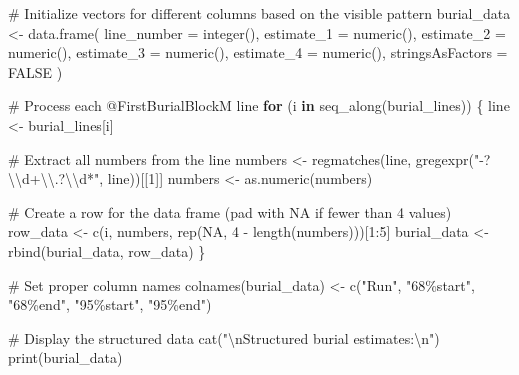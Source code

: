 \documentclass[
]{agujournal2019}
\newenvironment{Shaded}{\begin{snugshade}}{\end{snugshade}}
\newcommand{\AttributeTok}[1]{\textcolor[rgb]{0.40,0.45,0.13}{#1}}
\newcommand{\CommentTok}[1]{\textcolor[rgb]{0.37,0.37,0.37}{#1}}
\newcommand{\ConstantTok}[1]{\textcolor[rgb]{0.56,0.35,0.01}{#1}}
\newcommand{\ControlFlowTok}[1]{\textcolor[rgb]{0.00,0.23,0.31}{\textbf{#1}}}
\newcommand{\DecValTok}[1]{\textcolor[rgb]{0.68,0.00,0.00}{#1}}
\newcommand{\FunctionTok}[1]{\textcolor[rgb]{0.28,0.35,0.67}{#1}}
\newcommand{\NormalTok}[1]{\textcolor[rgb]{0.00,0.23,0.31}{#1}}
\newcommand{\OtherTok}[1]{\textcolor[rgb]{0.00,0.23,0.31}{#1}}
\newcommand{\SpecialCharTok}[1]{\textcolor[rgb]{0.37,0.37,0.37}{#1}}
\newcommand{\StringTok}[1]{\textcolor[rgb]{0.13,0.47,0.30}{#1}}
\begin{document}
\begin{Shaded}
\begin{Highlighting}[]
\CommentTok{\# Initialize vectors for different columns based on the visible pattern}
\NormalTok{burial\_data }\OtherTok{\textless{}{-}} \FunctionTok{data.frame}\NormalTok{(}
  \AttributeTok{line\_number =} \FunctionTok{integer}\NormalTok{(),}
  \AttributeTok{estimate\_1 =} \FunctionTok{numeric}\NormalTok{(),}
  \AttributeTok{estimate\_2 =} \FunctionTok{numeric}\NormalTok{(),}
  \AttributeTok{estimate\_3 =} \FunctionTok{numeric}\NormalTok{(),}
  \AttributeTok{estimate\_4 =} \FunctionTok{numeric}\NormalTok{(),}
  \AttributeTok{stringsAsFactors =} \ConstantTok{FALSE}
\NormalTok{)}

\CommentTok{\# Process each @FirstBurialBlockM line}
\ControlFlowTok{for}\NormalTok{ (i }\ControlFlowTok{in} \FunctionTok{seq\_along}\NormalTok{(burial\_lines)) \{}
\NormalTok{  line }\OtherTok{\textless{}{-}}\NormalTok{ burial\_lines[i]}
  
  \CommentTok{\# Extract all numbers from the line}
\NormalTok{  numbers }\OtherTok{\textless{}{-}} \FunctionTok{regmatches}\NormalTok{(line, }\FunctionTok{gregexpr}\NormalTok{(}\StringTok{"{-}?}\SpecialCharTok{\textbackslash{}\textbackslash{}}\StringTok{d+}\SpecialCharTok{\textbackslash{}\textbackslash{}}\StringTok{.?}\SpecialCharTok{\textbackslash{}\textbackslash{}}\StringTok{d*"}\NormalTok{, line))[[}\DecValTok{1}\NormalTok{]]}
\NormalTok{  numbers }\OtherTok{\textless{}{-}} \FunctionTok{as.numeric}\NormalTok{(numbers)}
  
  \CommentTok{\# Create a row for the data frame (pad with NA if fewer than 4 values)}
\NormalTok{  row\_data }\OtherTok{\textless{}{-}} \FunctionTok{c}\NormalTok{(i, numbers, }\FunctionTok{rep}\NormalTok{(}\ConstantTok{NA}\NormalTok{, }\DecValTok{4} \SpecialCharTok{{-}} \FunctionTok{length}\NormalTok{(numbers)))[}\DecValTok{1}\SpecialCharTok{:}\DecValTok{5}\NormalTok{]}
\NormalTok{  burial\_data }\OtherTok{\textless{}{-}} \FunctionTok{rbind}\NormalTok{(burial\_data, row\_data)}
\NormalTok{\}}

\CommentTok{\# Set proper column names}
\FunctionTok{colnames}\NormalTok{(burial\_data) }\OtherTok{\textless{}{-}} \FunctionTok{c}\NormalTok{(}\StringTok{"Run"}\NormalTok{, }\StringTok{"68\%start"}\NormalTok{, }\StringTok{"68\%end"}\NormalTok{, }\StringTok{"95\%start"}\NormalTok{, }\StringTok{"95\%end"}\NormalTok{)}

\CommentTok{\# Display the structured data}
\FunctionTok{cat}\NormalTok{(}\StringTok{"}\SpecialCharTok{\textbackslash{}n}\StringTok{Structured burial estimates:}\SpecialCharTok{\textbackslash{}n}\StringTok{"}\NormalTok{)}
\FunctionTok{print}\NormalTok{(burial\_data)}



\end{Highlighting}
\end{Shaded}
\end{document}
